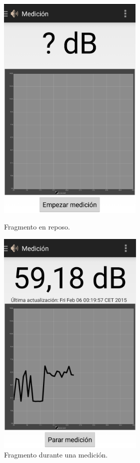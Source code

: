 \begin{figure}[h] \centering
 \begin{minipage}{0.45\textwidth}\centering
    \includegraphics[height=11cm]{graphs/measure-empty.png} \caption{Fragmento  en reposo.}\label{fig:screen:measure-empty}
 \end{minipage}
 \hfill
\begin{minipage}{0.45\textwidth}\centering
    \includegraphics[height=11cm]{graphs/screen_measure.png} \caption{Fragmento  durante una medición.}\label{fig:screen:measure}
\end{minipage}
\end{figure}

